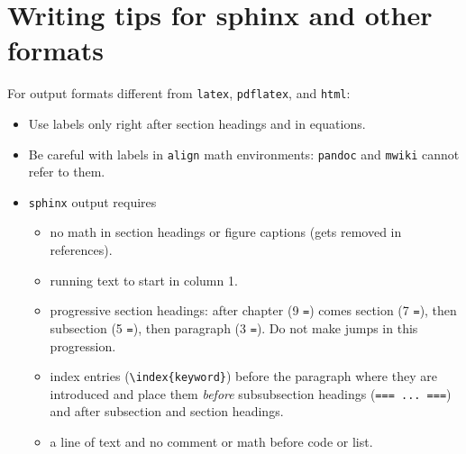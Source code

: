 \documentclass[%
twoside,                 %
final,                   %
chapterprefix=true,      %
open=right               %
10pt]{book}
\begin{document}
\noindent
\section*{Writing tips for sphinx and other formats}

For output formats different from \Verb!latex!, \Verb!pdflatex!, and \Verb!html!:

\begin{itemize}
 \item Use labels only right after section headings and in equations.

 \item Be careful with labels in \Verb!align! math environments: \Verb!pandoc!
   and \Verb!mwiki! cannot refer to them.

 \item \Verb!sphinx! output requires
\begin{itemize}

   \item no math in section headings or figure captions
     (gets removed in references).

   \item running text to start in column 1.

   \item progressive section headings: after chapter (9 \Verb!=!) comes
     section (7 \Verb!=!), then subsection (5 \Verb!=!), then paragraph
     (3 \Verb!=!). Do not make jumps in this progression.

   \item index entries (\Verb!\index{keyword}!) before the paragraph where they
     are introduced and place them \emph{before} subsubsection
     headings (\Verb!=== ... ===!) and after subsection and section headings.

   \item a line of text and no comment or math before code or list.
\end{itemize}

\noindent
\end{itemize}

\noindent



\printindex
\end{document}

